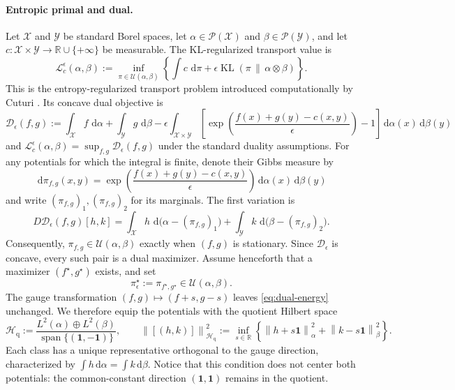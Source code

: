 \documentclass[11pt]{article}
\theoremstyle{definition}
\theoremstyle{remark}
\newcommand{\R}{\mathbb{R}}
\newcommand{\eps}{\epsilon}
\newcommand{\one}{\mathbf{1}}
\newcommand{\al}{\alpha}
\newcommand{\be}{\beta}
\newcommand{\Xx}{\mathcal{X}}
\newcommand{\Yy}{\mathcal{Y}}
\newcommand{\Couplings}{\mathcal{U}}
\newcommand{\MK}{\mathcal{L}}
\newcommand{\Dd}{\mathcal{D}}
\newcommand{\dd}{\,\mathrm{d}}
\newcommand{\norm}[1]{\left\lVert #1\right\rVert}
\DeclareMathOperator{\KL}{KL}
\begin{document}
\paragraph{Entropic primal and dual.}
Let $\Xx$ and $\Yy$ be standard Borel spaces, let
$\al\in\mathcal P(\Xx)$ and $\be\in\mathcal P(\Yy)$, and let
$c:\Xx\times\Yy\to\R\cup\{+\infty\}$ be measurable. The
KL-regularized transport value is
\begin{equation}
  \label{eq:primal}
  \MK_c^\eps(\al,\be)
  :=
  \inf_{\pi\in\Couplings(\al,\be)}
  \left\{
    \int c\,\dd\pi
    +
    \eps\KL(\pi\,\|\,\al\otimes\be)
  \right\}.
\end{equation}
This is the entropy-regularized transport problem introduced
computationally by Cuturi \cite{Cuturi2013}. Its concave dual objective
is
\begin{equation}
  \label{eq:dual-energy}
  \Dd_\eps(f,g)
  :=
  \int_{\Xx}f\,\dd\al+\int_{\Yy}g\,\dd\be
  -\eps\int_{\Xx\times\Yy}
  \left[
  \exp\left(\frac{f(x)+g(y)-c(x,y)}{\eps}\right)-1
  \right]
  \dd\al(x)\dd\be(y)
\end{equation}
and $\MK_c^\eps(\al,\be)=\sup_{f,g}\Dd_\eps(f,g)$ under the standard
duality assumptions. For any potentials for which the integral is
finite, denote their Gibbs measure by
\begin{equation}
  \label{eq:gibbs-measure}
  \dd\pi_{f,g}(x,y)
  =
  \exp\left(\frac{f(x)+g(y)-c(x,y)}{\eps}\right)
  \dd\al(x)\dd\be(y)
\end{equation}
and write $(\pi_{f,g})_1,(\pi_{f,g})_2$ for its marginals. The first
variation is
\begin{equation}
  \label{eq:dual-first-variation}
  D\Dd_\eps(f,g)[h,k]
  =
  \int_{\Xx}h\,\dd\bigl(\al-(\pi_{f,g})_1\bigr)
  +
  \int_{\Yy}k\,\dd\bigl(\be-(\pi_{f,g})_2\bigr).
\end{equation}
Consequently, $\pi_{f,g}\in\Couplings(\al,\be)$ exactly when $(f,g)$
is stationary. Since $\Dd_\eps$ is concave, every such pair is a dual
maximizer. Assume henceforth that a maximizer $(f^\star,g^\star)$
exists, and set
\begin{equation}
  \label{eq:optimal-gibbs-plan}
  \pi_\eps^\star:=\pi_{f^\star,g^\star}
  \in\Couplings(\al,\be).
\end{equation}
The gauge transformation
$(f,g)\mapsto(f+s,g-s)$ leaves \eqref{eq:dual-energy} unchanged. We
therefore equip the potentials with the quotient Hilbert space
\begin{equation}
  \label{eq:dual-quotient-space}
  \mathcal H_{\mathrm q}
  :=
  \frac{L^2(\al)\oplus L^2(\be)}
       {\operatorname{span}\{(\one,-\one)\}},
  \qquad
  \norm{[(h,k)]}_{\mathcal H_{\mathrm q}}^2
  :=
  \inf_{s\in\R}
  \left\{\norm{h+s\one}_\al^2+\norm{k-s\one}_\be^2\right\}.
\end{equation}
Each class has a unique representative orthogonal to the gauge
direction, characterized by
$\int h\dd\al=\int k\dd\be$. Notice that this condition does not center
both potentials: the common-constant direction $(\one,\one)$ remains
in the quotient.
\end{document}
